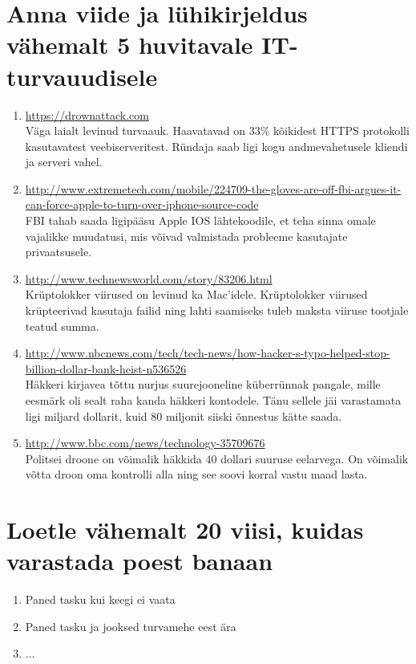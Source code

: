 \documentclass{article}
\begin{document}
\section{Anna viide ja lühikirjeldus vähemalt 5 huvitavale IT-turvauudisele}
\begin{enumerate}
	\item{\url{https://drownattack.com}\\
		Väga laialt levinud turvaauk. Haavatavad on 33\% kõikidest HTTPS protokolli kasutavatest veebiserveritest. 
		Ründaja saab ligi kogu andmevahetusele kliendi ja serveri vahel.}
	\item{\url{http://www.extremetech.com/mobile/224709-the-gloves-are-off-fbi-argues-it-can-force-apple-to-turn-over-iphone-source-code}\\
		FBI tahab saada ligipääsu Apple IOS lähtekoodile, et teha sinna omale vajalikke muudatusi, mis võivad valmistada probleeme kasutajate privaatsusele.}
	\item{\url{http://www.technewsworld.com/story/83206.html}\\
		Krüptolokker viirused on levinud ka Mac'idele. Krüptolokker viirused krüpteerivad kasutaja failid ning lahti saamiseks tuleb maksta viiruse tootjale teatud summa.}
	\item{\url{http://www.nbcnews.com/tech/tech-news/how-hacker-s-typo-helped-stop-billion-dollar-bank-heist-n536526}\\
		Häkkeri kirjavea tõttu nurjus suurejooneline küberrünnak pangale, mille eesmärk oli sealt raha kanda häkkeri kontodele. Tänu sellele jäi varastamata ligi miljard dollarit, kuid 80 miljonit siiski õnnestus kätte saada.}
	\item{\url{http://www.bbc.com/news/technology-35709676}\\
		Politsei droone on võimalik häkkida 40 dollari suuruse eelarvega. On võimalik võtta droon oma kontrolli alla ning see soovi korral vastu maad lasta.}
\end{enumerate}

\section{Loetle vähemalt 20 viisi, kuidas varastada poest banaan}
\begin{enumerate}
	\item{Paned tasku kui keegi ei vaata}
	\item{Paned tasku ja jooksed turvamehe eest ära}
	\item{...}
\end{enumerate}
\end{document}
